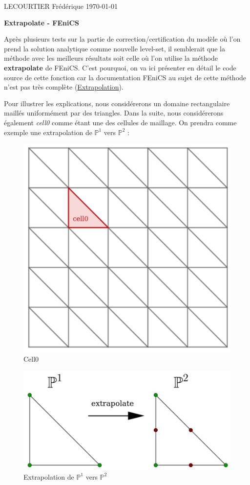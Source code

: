 \documentclass[french]{article}
\begin{document}
	LECOURTIER Frédérique \hfill \today
	\begin{center}
		\Large\textbf{{Extrapolate - FEniCS}}\\
	\end{center}
	\graphicspath{{images/}}

	Après plusieurs tests sur la partie de correction/certification du modèle où l'on prend la solution analytique comme nouvelle level-set, il semblerait que la méthode avec les meilleurs résultats soit celle où l'on utilise la méthode \textbf{extrapolate} de FEniCS. C'est pourquoi, on va ici présenter en détail le code source de cette fonction car la documentation FEniCS au sujet de cette méthode n'est pas très complète (\href{https://fenics.readthedocs.io/projects/dolfin/en/2017.2.0/apis/api_adaptivity.html#extrapolation}{Extrapolation}).
	
	Pour illustrer les explications, nous considérerons un domaine rectangulaire maillés uniformément par des triangles. Dans la suite, nous considérerons également \textit{cell0} comme étant une des cellules de maillage. On prendra comme exemple une extrapolation de $\mathbb{P}^1$ vers $\mathbb{P}^2$ : 
	
	\begin{minipage}{0.48\linewidth}
		\begin{figure}[H]
			\centering
			\includegraphics[width=0.5\linewidth]{cell0.png}
			\caption{Cell0}
		\end{figure}
	\end{minipage}
	\begin{minipage}{0.48\linewidth}
		\begin{figure}[H]
			\centering
			\includegraphics[width=0.9\linewidth]{P1toP2.png}
			\caption{Extrapolation de $\mathbb{P}^1$ vers $\mathbb{P}^2$}
		\end{figure}
	\end{minipage}
	
\end{document}
